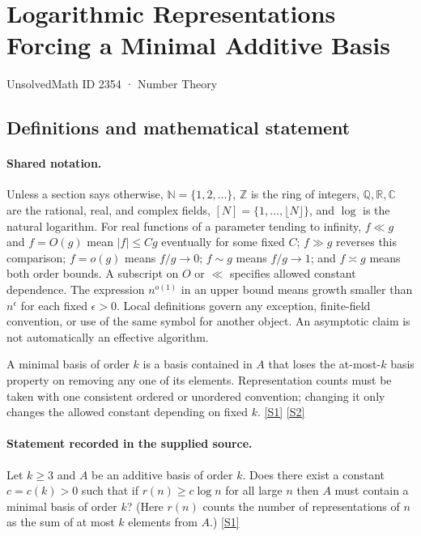 \documentclass[11pt,a4paper]{article}
\newcommand{\N}{\mathbb{N}}
\newcommand{\Z}{\mathbb{Z}}
\newcommand{\Q}{\mathbb{Q}}
\newcommand{\R}{\mathbb{R}}
\newcommand{\C}{\mathbb{C}}
\newcommand{\sref}[2]{\hyperlink{source:#1:#2}{[S#2]}}
\begin{document}

\setcounter{section}{2353}

\section{Logarithmic Representations Forcing a Minimal Additive Basis}\label{2354}

{\small\sffamily UnsolvedMath ID 2354 · Number Theory}

\subsection{Definitions and mathematical statement}

\paragraph{Shared notation.}Unless a section says otherwise, $\N=\{1,2,\ldots\}$,
$\Z$ is the ring of integers, $\Q,\R,\C$ are the rational, real, and complex
fields, $[N]=\{1,\ldots,\lfloor N\rfloor\}$, and $\log$ is the natural
logarithm. For real functions of a parameter tending to infinity,
$f\ll g$ and $f=O(g)$ mean $|f|\leq Cg$ eventually for some fixed $C$;
$f\gg g$ reverses this comparison; $f=o(g)$ means $f/g\to0$;
$f\sim g$ means $f/g\to1$; and $f\asymp g$ means both order bounds.
A subscript on $O$ or $\ll$ specifies allowed constant dependence.
The expression $n^{o(1)}$ in an upper bound means growth smaller than
$n^\epsilon$ for each fixed $\epsilon>0$. Local definitions govern any
exception, finite-field convention, or use of the same symbol for another
object. An asymptotic claim is not automatically an effective algorithm.



A minimal basis of order $k$ is a basis contained in $A$ that loses the at-most-$k$ basis property on removing any one of its elements. Representation counts must be taken with one consistent ordered or unordered convention; changing it only changes the allowed constant depending on fixed $k$. \sref{2354}{1} \sref{2354}{2}

\paragraph{Statement recorded in the supplied source.}
Let $k\geq 3$ and $A$ be an additive basis of order $k$. Does there exist a constant $c=c(k)>0$ such that if $r(n)\geq c\log n$ for all large $n$ then $A$ must contain a minimal basis of order $k$? (Here $r(n)$ counts the number of representations of $n$ as the sum of at most $k$ elements from $A$.) \sref{2354}{1}
\end{document}
